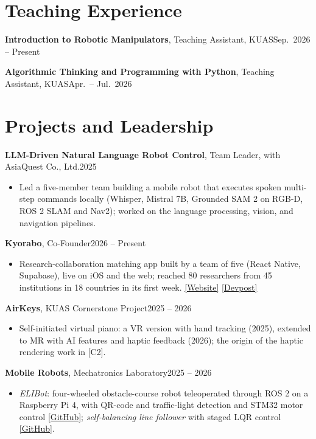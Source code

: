 \documentclass[11pt,a4paper]{article}
\let\cvorigsection\section
\renewcommand{\section}[1]{\Needspace{6\baselineskip}\cvorigsection{#1}}
\newcommand{\entry}[3]{\par\Needspace{4\baselineskip}\textbf{#1}#2\hfill #3\par\nopagebreak}
\begin{document}
\section{Teaching Experience}

\entry{Introduction to Robotic Manipulators}{, Teaching Assistant, KUAS}{Sep.\ 2026 -- Present}
\entry{Algorithmic Thinking and Programming with Python}{, Teaching Assistant, KUAS}{Apr.\ -- Jul.\ 2026}

\section{Projects and Leadership}

\entry{LLM-Driven Natural Language Robot Control}{, Team Leader, with AsiaQuest Co., Ltd.}{2025}
\begin{itemize}
  \item Led a five-member team building a mobile robot that executes spoken multi-step commands locally
        (Whisper, Mistral 7B, Grounded SAM 2 on RGB-D, ROS 2 SLAM and Nav2); worked on the language
        processing, vision, and navigation pipelines.
\end{itemize}

\entry{Kyorabo}{, Co-Founder}{2026 -- Present}
\begin{itemize}
  \item Research-collaboration matching app built by a team of five (React Native, Supabase), live on
        iOS and the web; reached 80 researchers from 45 institutions in 18 countries in its first week.
        \href{https://kyorabo.com/}{[Website]}
        \href{https://devpost.com/software/kyorabo-find-research-collaborators}{[Devpost]}
\end{itemize}

\entry{AirKeys}{, KUAS Cornerstone Project}{2025 -- 2026}
\begin{itemize}
  \item Self-initiated virtual piano: a VR version with hand tracking (2025), extended to MR with AI
        features and haptic feedback (2026); the origin of the haptic rendering work in [C2].
\end{itemize}

\entry{Mobile Robots}{, Mechatronics Laboratory}{2025 -- 2026}
\begin{itemize}
  \item \textit{ELIBot}: four-wheeled obstacle-course robot teleoperated through ROS 2 on a Raspberry
        Pi 4, with QR-code and traffic-light detection and STM32 motor control
        \href{https://github.com/ZahidMAbdullah/ELIBot}{[GitHub]}; \textit{self-balancing line follower}
        with staged LQR control
        \href{https://github.com/ZahidMAbdullah/Staged-LQR-LineFollowerBot}{[GitHub]}.
\end{itemize}
\end{document}
